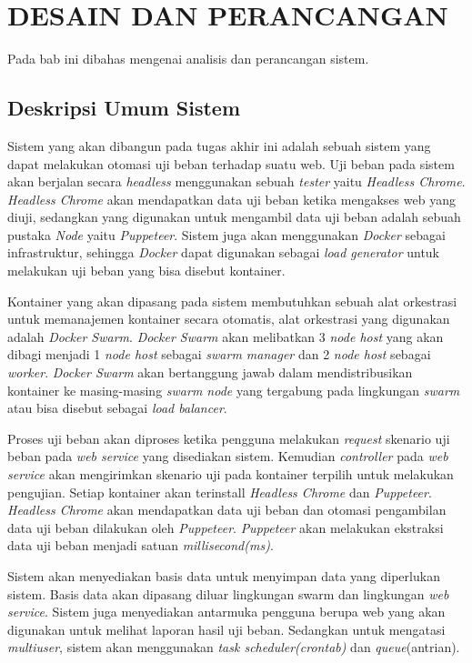 \chapter{DESAIN DAN PERANCANGAN}
    Pada bab ini dibahas mengenai analisis dan perancangan sistem.
    
    \section{Deskripsi Umum Sistem}
    	\indent Sistem yang akan dibangun pada tugas akhir ini adalah sebuah sistem yang dapat melakukan otomasi uji beban terhadap suatu web. Uji beban pada sistem akan berjalan secara \textit{headless} menggunakan sebuah \textit{tester} yaitu \textit{Headless Chrome}. \textit{Headless Chrome} akan mendapatkan data uji beban ketika mengakses web yang diuji, sedangkan yang digunakan untuk mengambil data uji beban adalah sebuah pustaka \textit{Node} yaitu \textit{Puppeteer}. Sistem juga akan menggunakan \textit{Docker} sebagai infrastruktur, sehingga \textit{Docker} dapat digunakan sebagai \textit{load generator} untuk melakukan uji beban yang bisa disebut kontainer.
    	
    	\indent Kontainer yang akan dipasang pada sistem membutuhkan sebuah alat orkestrasi untuk memanajemen kontainer secara otomatis, alat orkestrasi yang digunakan adalah \textit{Docker Swarm}. \textit{Docker Swarm} akan melibatkan 3 \textit{node host} yang akan dibagi menjadi 1 \textit{node host} sebagai \textit{swarm manager} dan 2 \textit{node host} sebagai \textit{worker}. \textit{Docker Swarm} akan bertanggung jawab dalam mendistribusikan kontainer ke masing-masing \textit{swarm node} yang tergabung pada lingkungan \textit{swarm} atau bisa disebut sebagai \textit{load balancer}.
    	
    	\indent Proses uji beban akan diproses ketika pengguna melakukan \textit{request} skenario uji beban pada \textit{web service} yang disediakan sistem. Kemudian \textit{controller} pada \textit{web service} akan mengirimkan skenario uji pada kontainer terpilih untuk melakukan pengujian. Setiap kontainer akan terinstall \textit{Headless Chrome} dan \textit{Puppeteer}. \textit{Headless Chrome} akan mendapatkan data uji beban dan otomasi pengambilan data uji beban dilakukan oleh \textit{Puppeteer}. \textit{Puppeteer} akan melakukan ekstraksi data uji beban menjadi satuan \textit{millisecond(ms)}. 
    	
    	\indent Sistem akan menyediakan basis data untuk menyimpan data yang diperlukan sistem. Basis data akan dipasang diluar lingkungan swarm dan lingkungan \textit{web service}. Sistem juga menyediakan antarmuka pengguna berupa web yang akan digunakan untuk melihat laporan hasil uji beban. Sedangkan untuk mengatasi \textit{multiuser}, sistem akan menggunakan \textit{task scheduler(crontab)} dan \textit{queue}(antrian).
    
